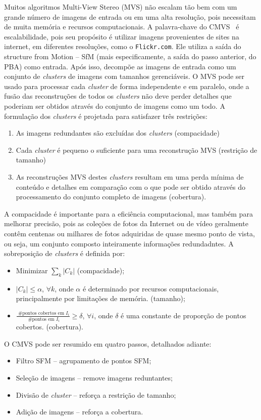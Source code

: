 Muitos algoritmos Multi-View Stereo (MVS) não escalam tão bem com um grande
número de imagens de entrada ou em uma alta resolução, pois necessitam de muita
memória e recursos computacionais. A palavra-chave do
CMVS~\cite{visualSfMPMVS,wu2013towards,li2013improving} é escalabilidade, pois
seu propósito é utilizar imagens provenientes de sites na internet, em
diferentes resoluções, como o \texttt{Flickr.com}.  Ele utiliza a saída do structure from
Motion -- SfM (mais especificamente, a saída do passo anterior, do PBA) 
como entrada. Após isso, decompõe as imagens de entrada como um conjunto de
\emph{clusters} de imagens com tamanhos gerenciáveis. O MVS pode ser usado para
processar cada \emph{cluster} de forma independente e em paralelo, onde a fusão
das reconstruções de todos os \emph{clusters} não deve perder detalhes que
poderiam ser obtidos através do conjunto de imagens como um todo.
A formulação dos \emph{clusters} é projetada para satisfazer três restrições: 
\begin{enumerate}
\item{As imagens redundantes são excluídas dos \emph{clusters} (compacidade)}
\item{Cada \emph{cluster} é pequeno o suficiente para uma reconstrução MVS (restrição de tamanho)}
\item{As reconstruções MVS destes \emph{clusters} resultam em uma perda mínima de conteúdo e detalhes em comparação com o que pode ser obtido através do processamento do conjunto completo de imagens (cobertura).}
\end{enumerate}
A compacidade é importante para a eficiência computacional, mas também para
melhorar precisão, pois as coleções de fotos da Internet ou de vídeo geralmente
contêm centenas ou milhares de fotos adquiridas de quase mesmo ponto de vista,
ou seja, um conjunto composto inteiramente informações redundadntes.  A
sobreposição de \emph{clusters} é definida por:
\begin{itemize}
\item Minimizar $\sum_{k} |C_k|$ (compacidade);
\item $|C_k| \le \alpha$, $\forall k$, onde $\alpha$ é determinado por recursos computacionais, principalmente por limitações de memória. (tamanho);
\item $\frac{\text{ \# pontos cobertos em } I_i}{\text{ \# pontos em } I_i} \ge
  \delta$, $\forall i$, onde $\delta$ é uma constante de proporção de pontos cobertos. (cobertura).
\end{itemize}
O CMVS pode ser resumido em quatro passos, detalhados adiante:
\begin{itemize}
\item Filtro SFM -- agrupamento de pontos SFM;
\item Seleção de imagens -- remove imagens reduntantes;
\item Divisão de \emph{cluster} -- reforça a restrição de tamanho;
\item Adição de imagens -- reforça a cobertura.
\end{itemize}

